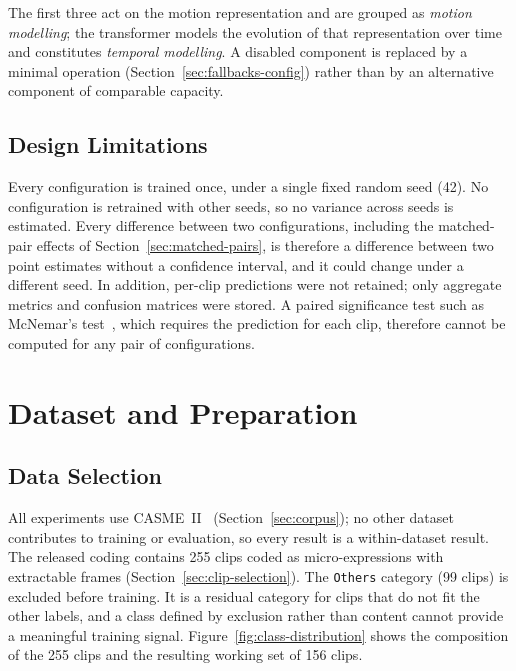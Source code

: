 The first three act on the motion representation and are grouped as \textit{motion modelling}; the transformer models the evolution of that representation over time and constitutes \textit{temporal modelling}. A disabled component is replaced by a minimal operation (Section~\ref{sec:fallbacks-config}) rather than by an alternative component of comparable capacity.

\subsection{Design Limitations}
\label{sec:design-limitation}
\label{sec:what-is-stored}

Every configuration is trained once, under a single fixed random seed (42). No configuration is retrained with other seeds, so no variance across seeds is estimated. Every difference between two configurations, including the matched-pair effects of Section~\ref{sec:matched-pairs}, is therefore a difference between two point estimates without a confidence interval, and it could change under a different seed. In addition, per-clip predictions were not retained; only aggregate metrics and confusion matrices were stored. A paired significance test such as McNemar's test~\cite{mcnemar1947}, which requires the prediction for each clip, therefore cannot be computed for any pair of configurations.


\section{Dataset and Preparation}
\label{sec:corpus-preparation}

\subsection{Data Selection}
\label{sec:corpus-used}
\label{sec:255-to-156}

All experiments use CASME~II~\cite{yan2014} (Section~\ref{sec:corpus}); no other dataset contributes to training or evaluation, so every result is a within-dataset result. The released coding contains 255 clips coded as micro-expressions with extractable frames (Section~\ref{sec:clip-selection}). The \texttt{Others} category (99 clips) is excluded before training. It is a residual category for clips that do not fit the other labels, and a class defined by exclusion rather than content cannot provide a meaningful training signal. Figure~\ref{fig:class-distribution} shows the composition of the 255 clips and the resulting working set of 156 clips.

